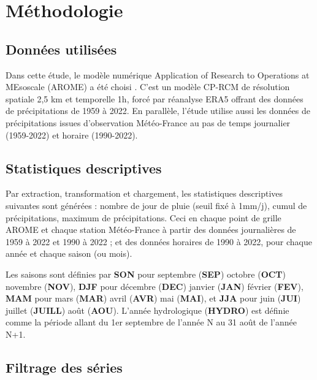 \documentclass[
  article,
  nofooter,
  noheadings]{jss}
\begin{document}
\section{Méthodologie}\label{muxe9thodologie}

\subsection{Données utilisées}\label{donnuxe9es-utilisuxe9es}

Dans cette étude, le modèle numérique Application of Research to
Operations at MEsoscale (AROME) a été choisi
\citep{caillaud2021simulation}. C'est un modèle CP-RCM de résolution
spatiale 2,5 km et temporelle 1h, forcé par réanalyse ERA5
\citep{hersbach2020era5} offrant des données de précipitations de 1959 à
2022. En parallèle, l'étude utilise aussi les données de précipitations
issues d'observation Météo-France \citep{meteofrance2024} au pas de
temps journalier (1959-2022) et horaire (1990-2022).

\subsection{Statistiques descriptives}\label{statistiques-descriptives}

Par extraction, transformation et chargement, les statistiques
descriptives suivantes sont générées : nombre de jour de pluie (seuil
fixé à 1mm/j), cumul de précipitations, maximum de précipitations. Ceci
en chaque point de grille AROME et chaque station Météo-France à partir
des données journalières de 1959 à 2022 et 1990 à 2022 ; et des données
horaires de 1990 à 2022, pour chaque année et chaque saison (ou mois).

Les saisons sont définies par \textbf{SON} pour septembre (\textbf{SEP})
octobre (\textbf{OCT}) novembre (\textbf{NOV}), \textbf{DJF} pour
décembre (\textbf{DEC}) janvier (\textbf{JAN}) février (\textbf{FEV}),
\textbf{MAM} pour mars (\textbf{MAR}) avril (\textbf{AVR}) mai
(\textbf{MAI}), et \textbf{JJA} pour juin (\textbf{JUI}) juillet
(\textbf{JUILL}) août (\textbf{AOU}). L'année hydrologique
(\textbf{HYDRO}) est définie comme la période allant du 1er septembre de
l'année N au 31 août de l'année N+1.

\subsection{Filtrage des séries}\label{filtrage-des-suxe9ries}
\end{document}
